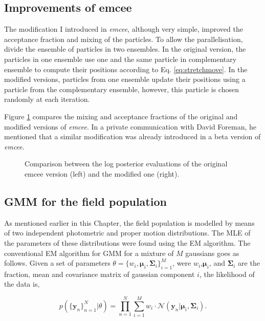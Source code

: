 \subsection{Improvements of emcee}
The modification I introduced in \emph{emcee}, although very simple, improved the acceptance fraction and mixing of the particles.
To allow the parallelisation, \citet{Foreman2013} divide the ensemble of particles in two ensembles. In the original version, the particles in one ensemble use one and the same particle in complementary ensemble to compute their positions according to Eq. \ref{eq:stretchmove}. In the modified versions, particles from one ensemble update their positions using a particle from the complementary ensemble, however, this particle is chosen randomly at each iteration. 

Figure \ref{fig:emceeDANCe} compares the mixing and acceptance fractions of the original and modified versions of \emph{emcee}. In a private communication with David Foreman, he mentioned that a similar modification was already introduced in a beta version of \emph{emcee}.
\begin{figure}[htbp]
\begin{center}
\caption{Comparison between the log posterior evaluations of the original emcee version (left) and the modified one (right). }
\label{fig:emceeDANCe}
\end{center}
\end{figure}
\subsection{GMM for the field population}
As mentioned earlier in this Chapter, the field population is modelled by means of two independent photometric and proper motion distributions. The MLE of the parameters of these distributions were found using the EM algorithm.  The conventional EM algorithm for GMM \citep{Dempster1977} for a mixture of $M$ gaussians goes as follows. Given a set of parameters $\theta=\{w_i,\boldsymbol{\mu}_i,\boldsymbol{\Sigma}_i\}_{i=1}^M$, were $w_i$,$\boldsymbol{\mu}_i$, and $\boldsymbol{\Sigma}_i$ are the fraction, mean and covariance matrix of gaussian component $i$, the likelihood of the data is,

\begin{equation}
p(\{\mathbf{y}_n\}_{n=1}^N|\theta)=\prod_{n=1}^N {\sum_{i=1} ^M {w_i\cdot \mathcal{N}(\mathbf{y}_n|\boldsymbol{\mu}_i,\boldsymbol{\Sigma}_i)}}.
\end{equation}

